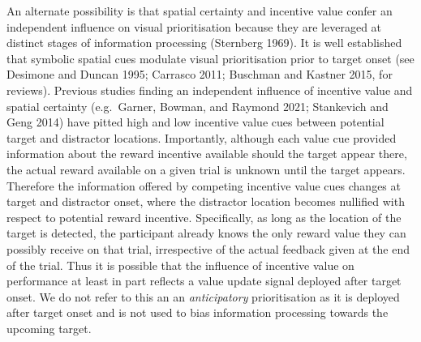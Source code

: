 \documentclass[11pt,halfline,a4paper,]{ouparticle}
\begin{document}
An alternate possibility is that spatial certainty and incentive value confer an independent influence on visual prioritisation because they are leveraged at distinct stages of information processing (Sternberg 1969). It is well established that symbolic spatial cues modulate visual prioritisation prior to target onset (see Desimone and Duncan 1995; Carrasco 2011; Buschman and Kastner 2015, for reviews). Previous studies finding an independent influence of incentive value and spatial certainty (e.g.~Garner, Bowman, and Raymond 2021; Stankevich and Geng 2014) have pitted high and low incentive value cues between potential target and distractor locations. Importantly, although each value cue provided information about the reward incentive available should the target appear there, the actual reward available on a given trial is unknown until the target appears. Therefore the information offered by competing incentive value cues changes at target and distractor onset, where the distractor location becomes nullified with respect to potential reward incentive. Specifically, as long as the location of the target is detected, the participant already knows the only reward value they can possibly receive on that trial, irrespective of the actual feedback given at the end of the trial. Thus it is possible that the influence of incentive value on performance at least in part reflects a value update signal deployed after target onset. We do not refer to this an an \emph{anticipatory} prioritisation as it is deployed after target onset and is not used to bias information processing towards the upcoming target.
\end{document}

